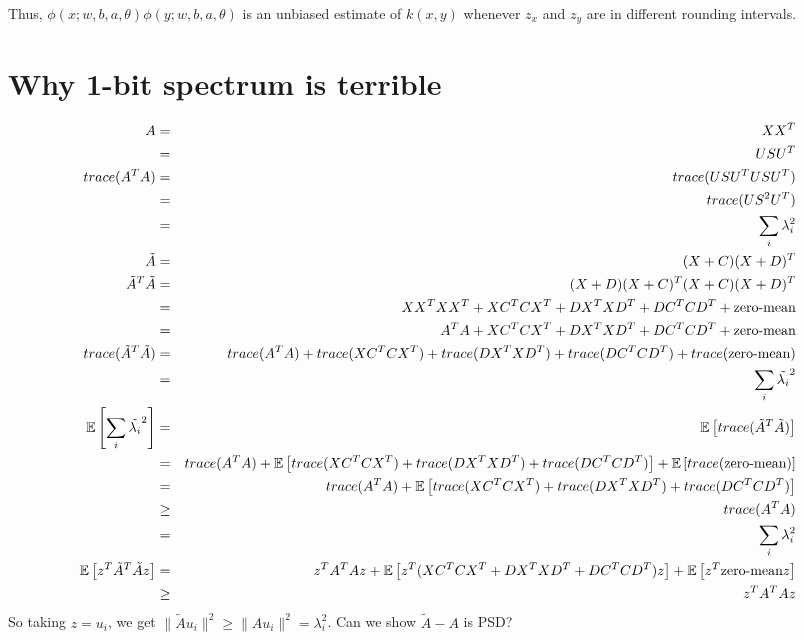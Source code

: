 \documentclass[12pt]{article}
\newcommand{\sq}{\sqrt{2}}
\newcommand{\teps}{\tilde{\epsilon}}
\newcommand{\tS}{\tilde{S}}
\newcommand{\tA}{\tilde{A}}
\begin{document}
Thus, $\phi(x;w,b,a,\theta)\phi(y;w,b,a,\theta)$ is an unbiased estimate of $k(x,y)$ whenever
$z_x$ and $z_y$ are in different rounding intervals.

\section{Why 1-bit spectrum is terrible}
\begin{eqnarray*}
	A &=& XX^T \\
	&=& USU^T \\ %
	trace(A^T A) &=& trace( USU^T U S U^T)\\
	&=& trace( US^2 U^T) \\
	&=& \sum_i{\lambda_i^2}\\
	\tA &=& (X+C)(X+D)^T \\
	\tA^T\tA &=& (X+D)(X+C)^T(X+C)(X+D)^T \\
	&=& XX^TXX^T + XC^TCX^T + DX^TXD^T + DC^TCD^T + \text{zero-mean}\\ 
	&=& A^TA + XC^TCX^T + DX^TXD^T + DC^TCD^T + \text{zero-mean}\\ 
	trace(\tA^T\tA) &=& trace(A^TA) + trace(XC^TCX^T) + trace(DX^TXD^T) + trace(DC^TCD^T) + trace(\text{zero-mean})\\ 
	&=& \sum_i \tilde{\lambda_i}^2\\
	\expect{}{\sum_i \tilde{\lambda_i}^2} &=& \expect{}{trace(\tA^T\tA)} \\
	&=& trace(A^TA) + \expect{}{trace(XC^TCX^T) + trace(DX^TXD^T) + trace(DC^TCD^T)} + \expect{}{trace(\text{zero-mean})}\\
	&=& trace(A^TA) + \expect{}{trace(XC^TCX^T) + trace(DX^TXD^T) + trace(DC^TCD^T)}\\	
	&\geq& trace(A^TA) \\
	&=&  \sum_i{\lambda_i^2} \\
	\expect{}{z^T \tA^T\tA z} &=& z^TA^TAz + \expect{}{z^T(XC^TCX^T + DX^TXD^T + DC^TCD^T)z} + \expect{}{z^T\text{zero-mean}z}\\ 
	&\geq& z^TA^TAz 
\end{eqnarray*}
So taking $z = u_i$, we get $\|\tA u_i\|^2 \geq \|Au_i\|^2 = \lambda_i^2$.
Can we show $\tA-A$ is PSD?

\end{document}
